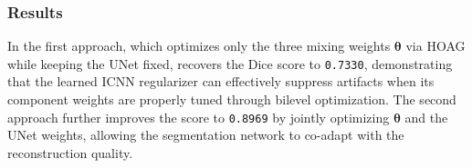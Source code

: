 \subsubsection{Results}

In the first approach, which optimizes only the three mixing weights $\boldsymbol{\theta}$ via HOAG while keeping the UNet fixed, recovers the Dice score to \texttt{0.7330}, demonstrating that the learned ICNN regularizer can effectively suppress artifacts when its component weights are properly tuned through bilevel optimization. The second approach further improves the score to \texttt{0.8969} by jointly optimizing $\boldsymbol{\theta}$ and the UNet weights, allowing the segmentation network to co-adapt with the reconstruction quality.




